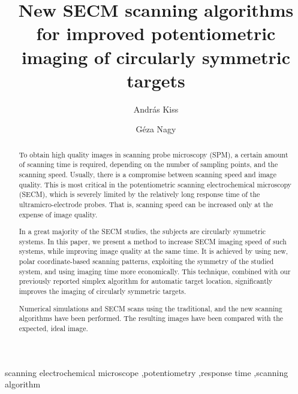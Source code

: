 \documentclass[3p]{elsarticle}
\begin{document}
\begin{frontmatter}

\title{New SECM scanning algorithms for improved potentiometric imaging of circularly symmetric targets}
\author[akiss]{Andr\'{a}s Kiss}
\address[akiss, gnagy]{Department of General and Physical Chemistry, Faculty of Sciences, University of P\'{e}cs, 7624 P\'{e}cs, Ifj\'{u}s\'{a}g \'{u}tja 6, Hungary}
\address[akiss, gnagy]{J\'{a}nos Szent\'{a}gothai Research Centre, University of P\'{e}cs, 7624 P\'{e}cs, Ifj\'{u}s\'{a}g \'{u}tja 20, Hungary}
\author[gnagy]{G\'{e}za Nagy}

\begin{abstract}

To obtain high quality images in scanning probe microscopy (SPM), a certain amount of scanning time is required, depending on the number of sampling points, and the scanning speed. Usually, there is a compromise between scanning speed and image quality. This is most critical in the potentiometric scanning electrochemical microscopy (SECM), which is severely limited by the relatively long response time of the ultramicro-electrode probes. That is, scanning speed can be increased only at the expense of image quality.

In a great majority of the SECM studies, the subjects are circularly symmetric systems. In this paper, we present a method to increase SECM imaging speed of such systems, while improving image quality at the same time. It is achieved by using new, polar coordinate-based scanning patterns, exploiting the symmetry of the studied system, and using imaging time more economically. This technique, combined with our previously reported simplex algorithm for automatic target location, significantly improves the imaging of circularly symmetric targets.

Numerical simulations and SECM scans using the traditional, and the new scanning algorithms have been performed. The resulting images have been compared with the expected, ideal image.

\end{abstract}
	
\begin{keyword}
	scanning electrochemical microscope \sep potentiometry \sep response time \sep scanning algorithm
\end{keyword}
\end{frontmatter}
\end{document}

